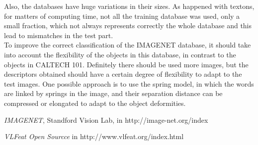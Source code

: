 \documentclass[10pt,twocolumn,letterpaper]{article}
\begin{document}
Also, the databases have huge variations in their sizes. As happened with textons, for matters of computing time, not all the training database was used, only a small fraction, which not always represents correctly the whole database and this lead to mismatches in the test part.\\

To improve the correct classification of the IMAGENET database, it should take into account the flexibility of the objects in this database, in contrast to the objects in CALTECH 101. Definitely there should be used more images, but the descriptors obtained should have a certain degree of flexibility to adapt to the test images. One possible approach is to use the spring model, in which the words are linked by springs in the image, and their separation distance can be compressed or elongated to adapt to the object deformities.


\begin{thebibliography}{9}

  \emph{IMAGENET},
  Standford Vision Lab,
  in http://image-net.org/index


\emph{VLFeat Open Sourcce}
in http://www.vlfeat.org/index.html

\end{thebibliography}




\end{document}
